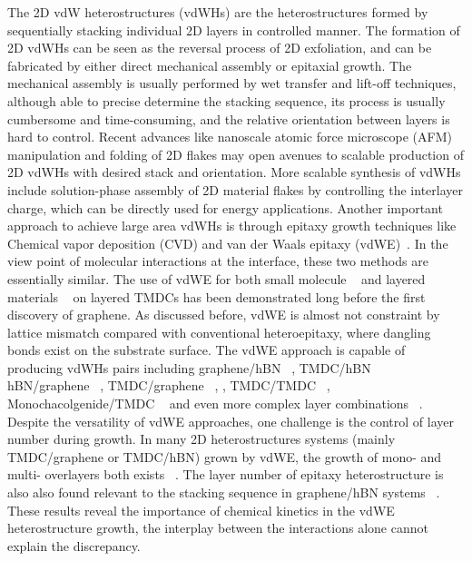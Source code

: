 The 2D vdW heterostructures (vdWHs) are the heterostructures formed by
sequentially stacking individual 2D layers in controlled manner. The
formation of 2D vdWHs can be seen as the reversal process of 2D
exfoliation, and can be fabricated by either direct mechanical
assembly or epitaxial growth.
%
The mechanical assembly is usually performed by wet transfer and
lift-off techniques,
although able to precise determine the stacking
sequence, its process is usually cumbersome and time-consuming, and
the relative orientation between layers is hard to
control.  Recent advances like
nanoscale atomic force microscope (AFM) manipulation and folding of 2D
flakes may open avenues to scalable production of 2D vdWHs with
desired stack and orientation. 
%
More scalable synthesis of vdWHs include solution-phase assembly of 2D
material flakes by controlling the interlayer charge, which can be
directly used for energy applications.
%
Another important approach to achieve large area vdWHs is through
epitaxy growth techniques like Chemical vapor deposition (CVD) and
van der Waals epitaxy (vdWE)~\cite{Novoselov_2016_vdW}. In the view point of
molecular interactions at the interface, these two methods are
essentially similar. The use of vdWE for both
small molecule ~\cite{Hara_1989_cupc_mos2_vdwe,Sakurai_1991_c60_mos2} and
layered materials
~\cite{Koma_1985_vdWE,Ueno_1990_vdWE,Ohuchi_1990_MoSe2_SnS2,Parkinson_1991_vdWE}
on layered TMDCs has been demonstrated long before the first discovery
of graphene. As discussed before, vdWE is almost not constraint by lattice mismatch compared with conventional heteroepitaxy,
where dangling bonds exist on the substrate surface.
%
The vdWE approach is capable of producing vdWHs pairs including
graphene/hBN ~\cite{Yang_2013_gr_hBN}, TMDC/hBN
~\cite{Yan_2015_MoS2_on_hBN,Wang_2015_cvd_MoS2_BN,
  Cattelan_2015_Ws2_hBN} hBN/graphene ~\cite{Lin_2014_vdW_solid},
TMDC/graphene
~\cite{Shi_2012_vdw_epi_MoS2_gr,McCreary_2014_MoS2_gr,Azizi_2015_Freevdw_Gr_TMDCs,Miwa_2015_MoS2_gr,Ago_2015_MoS2_Gr,Lin_2014_WS2_Gr,Lin_2015_Wse2_MoS2_gr},
, TMDC/TMDC ~\cite{Diaz_2015_MoTe2_MoSe2,Gong_2014_WS2_MoS2},
Monochacolgenide/TMDC
~\cite{Li_2016_GaSe_MoSe2_vdW,Zhang_2014_vdw_epi_SnS2_MoS2} and even
more complex layer combinations
~\cite{Lin_2015_Wse2_MoS2_gr,Alemayehu_2015_TMDC_vdw}.
% 
Despite the versatility of vdWE approaches, one challenge is the
control of layer number  during growth.
%
In many 2D heterostructures systems (mainly TMDC/graphene or TMDC/hBN)
grown by vdWE, the growth of mono- and multi- overlayers both exists
~\cite{Shi_2012_vdw_epi_MoS2_gr,Azizi_2015_Freevdw_Gr_TMDCs,Miwa_2015_MoS2_gr,Yan_2015_MoS2_on_hBN}.
%
The layer number of epitaxy heterostructure is also
also found relevant to the stacking sequence in graphene/hBN systems ~\cite{Wu_2015_Gr_hBN,Yang_2013_gr_hBN,Wu_2015_Gr_hBN}.
%
These results reveal the
importance of chemical kinetics in the vdWE heterostructure growth,
the interplay between the interactions alone cannot explain the
discrepancy.

